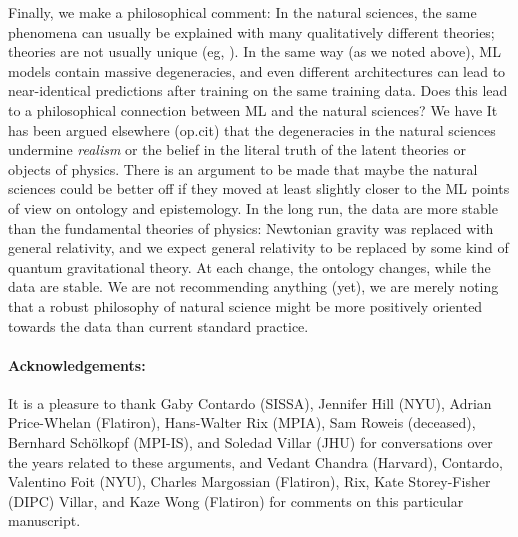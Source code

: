 \documentclass[10pt]{article}
\begin{document}
Finally, we make a philosophical comment:
In the natural sciences, the same phenomena can usually be explained with many qualitatively different theories; theories are not usually unique (eg, \citealt{hogg, peebles}).
In the same way (as we noted above), ML models contain massive degeneracies, and even different architectures can lead to near-identical predictions after training on the same training data.
Does this lead to a philosophical connection between ML and the natural sciences?
\ifarxiv
We have
\else
It has been
\fi
argued elsewhere (op.cit) that the degeneracies in the natural sciences undermine \emph{realism} or the belief in the literal truth of the latent theories or objects of physics.
There is an argument to be made that maybe the natural sciences could be better off if they moved at least slightly closer to the ML points of view on ontology and epistemology.
In the long run, the data are more stable than the fundamental theories of physics:
Newtonian gravity was replaced with general relativity, and we expect general relativity to be replaced by some kind of quantum gravitational theory.
At each change, the ontology changes, while the data are stable.
We are not recommending anything (yet), we are merely noting that a robust philosophy of natural science might be more positively oriented towards the data than current standard practice.

\ifarxiv
\paragraph{Acknowledgements:}
It is a pleasure to thank
  Gaby Contardo (SISSA),
  Jennifer Hill (NYU),
  Adrian Price-Whelan (Flatiron),
  Hans-Walter Rix (MPIA),
  Sam Roweis (deceased),
  Bernhard Sch\"olkopf (MPI-IS), and
  Soledad Villar (JHU)
for conversations over the years related to these arguments, and
  Vedant Chandra (Harvard),
  Contardo,
  Valentino Foit (NYU),
  Charles Margossian (Flatiron),
  Rix,
  Kate Storey-Fisher (DIPC)
  Villar, and
  Kaze Wong (Flatiron)
for comments on this particular manuscript.
\else
\fi

\ifarxiv
{\raggedright\footnotesize


}
\else


\fi

\clearpage\appendix
\end{document}
